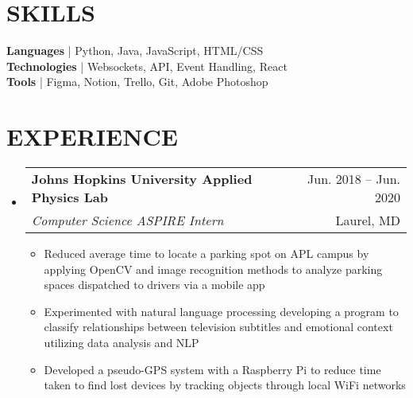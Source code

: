 \documentclass[letterpaper,12pt]{extarticle}
\makeatletter
\newcommand{\resumeItem}[1]{
  \item\small{
    {#1 \vspace{-1pt}}
  }
}
\newcommand{\resumeSubheading}[4]{
  \vspace{-1pt}\item
    \begin{tabular*}{\textwidth}[t]{l@{\extracolsep{\fill}}r}
      \textbf{#1} & {\color{dark-grey}\small #2}\vspace{1pt}\\ %
      \textit{#3} & {\color{dark-grey} \small #4}\\ %
    \end{tabular*}\vspace{-4pt}
}
\newcommand{\resumeSubHeadingListStart}{\begin{itemize}[leftmargin=0in, label={}]}
\newcommand{\resumeSubHeadingListEnd}{\end{itemize}}
\newcommand{\resumeItemListStart}{\begin{itemize}}
\newcommand{\resumeItemListEnd}{\end{itemize}\vspace{0pt}}
\makeatother
\begin{document}
\vspace{-7mm}
\section{SKILLS}
 \begin{itemize}[leftmargin=0in, label={}]
    \small{\item{
     \textbf{Languages}    {| Python, Java, JavaScript, HTML/CSS}\vspace{2pt} \\
     \textbf{Technologies} {| Websockets, API, Event Handling, React}\vspace{2pt} \\
     \textbf{Tools}        {| Figma, Notion, Trello, Git, Adobe Photoshop}
    }}
 \end{itemize}
 
 \vspace{-6mm}
\section{EXPERIENCE}
  \resumeSubHeadingListStart
    \resumeSubheading
    {Johns Hopkins University Applied Physics Lab}{Jun. 2018 -- Jun. 2020}
    {Computer Science ASPIRE Intern}{Laurel, MD}
    \resumeItemListStart
        \resumeItem{
            Reduced average time to locate a parking spot on APL campus by applying OpenCV and image recognition methods to analyze parking spaces dispatched to drivers via a mobile app}
        \resumeItem{
            Experimented with natural language processing developing a program to classify relationships between television subtitles and emotional context utilizing data analysis and NLP}
        \resumeItem{
            Developed a pseudo-GPS system with a Raspberry Pi to reduce time
            taken to find lost devices by tracking objects through local
            WiFi networks
        }
    \resumeItemListEnd

  \resumeSubHeadingListEnd

\vspace{-7mm}
\end{document}
